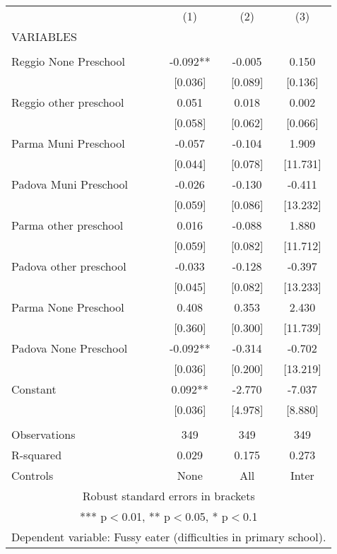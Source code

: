 \begin{tabular}{lccc} \hline
 & (1) & (2) & (3) \\
VARIABLES &  &  &  \\ \hline
 &  &  &  \\
Reggio None Preschool & -0.092** & -0.005 & 0.150 \\
 & [0.036] & [0.089] & [0.136] \\
Reggio other preschool & 0.051 & 0.018 & 0.002 \\
 & [0.058] & [0.062] & [0.066] \\
Parma Muni Preschool & -0.057 & -0.104 & 1.909 \\
 & [0.044] & [0.078] & [11.731] \\
Padova Muni Preschool & -0.026 & -0.130 & -0.411 \\
 & [0.059] & [0.086] & [13.232] \\
Parma other preschool & 0.016 & -0.088 & 1.880 \\
 & [0.059] & [0.082] & [11.712] \\
Padova other preschool & -0.033 & -0.128 & -0.397 \\
 & [0.045] & [0.082] & [13.233] \\
Parma None Preschool & 0.408 & 0.353 & 2.430 \\
 & [0.360] & [0.300] & [11.739] \\
Padova None Preschool & -0.092** & -0.314 & -0.702 \\
 & [0.036] & [0.200] & [13.219] \\
Constant & 0.092** & -2.770 & -7.037 \\
 & [0.036] & [4.978] & [8.880] \\
 &  &  &  \\
Observations & 349 & 349 & 349 \\
R-squared & 0.029 & 0.175 & 0.273 \\
 Controls & None & All & Inter \\ \hline
\multicolumn{4}{c}{ Robust standard errors in brackets} \\
\multicolumn{4}{c}{ *** p$<$0.01, ** p$<$0.05, * p$<$0.1} \\
\multicolumn{4}{c}{ Dependent variable: Fussy eater (difficulties in primary school).} \\
\end{tabular}
